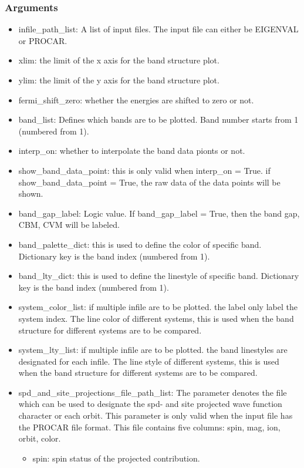\documentclass[12pt]{book}
\begin{document}
\subsubsection{Arguments}
\begin{itemize}
\item infile\_path\_list: A list of input files. The input file can either be EIGENVAL or PROCAR.
\item xlim: the limit of the x axis for the band structure plot.
\item ylim: the limit of the y axis for the band structure plot.
\item fermi\_shift\_zero: whether the energies are shifted to zero or not.
\item band\_list: Defines which bands are to be plotted. Band number starts from 1 (numbered from 1).
\item interp\_on: whether to interpolate the band data pionts or not.
\item show\_band\_data\_point: this is only valid when interp\_on = True. if show\_band\_data\_point = True, the raw data of the data points will be shown.
\item band\_gap\_label: Logic value. If band\_gap\_label = True, then the band gap, CBM, CVM will be labeled.
\item band\_palette\_dict: this is used to define the color of specific band. Dictionary key is the band index (numbered from 1).
\item band\_lty\_dict: this is used to define the linestyle of specific band. Dictionary key is the band index (numbered from 1).
\item system\_color\_list: if multiple infile are to be plotted. the label only label the system index. The line color of different systems, this is used when the band structure for different systems are to be compared.
\item system\_lty\_list: if multiple infile are to be plotted. the band linestyles are designated for each infile. The line style of different systems, this is used when the band structure for different systems are to be compared.
\item spd\_and\_site\_projections\_file\_path\_list: The parameter denotes the file which can be used to designate the spd- and site projected wave function character or each orbit. This parameter is only valid when the input file has the PROCAR file format. This file contains five columns: spin, mag, ion, orbit, color.
    \begin{itemize}
    \item spin: spin status of the projected contribution.


\end{itemize}
\end{itemize}
\end{document}
